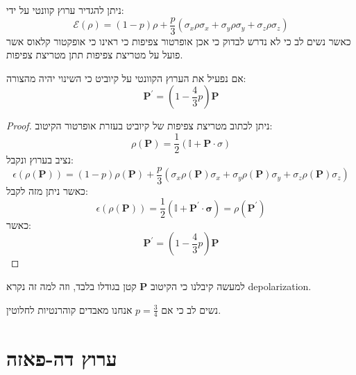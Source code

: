 \documentclass{tstextbook}
\begin{document}
\begin{corollary}
ניתן להגדיר ערוץ קוונטי על ידי:
$$\mathcal{E} \left(\rho\right)=\left(1-p\right)\rho+\frac{p}{3}\left(\sigma_{x}\rho\sigma_{x}+\sigma_{y}\rho\sigma_{y}+\sigma_{z}\rho\sigma_{z}\right)$$
כאשר נשים לב כי לא נדרש לבדוק כי אכן אופרטור צפיפות כי ראינו כי אופקטור קלאוס אשר פועל על מטריצת צפיפות תתן מטריצת צפיפות.

\end{corollary}
\begin{proposition}
אם נפעיל את הערוץ הקוונטי על קיוביט כי השינוי יהיה מהצורה:
$$\mathbf{P}^{\prime}=\left(1-{\frac{4}{3}}p\right)\mathbf{P}$$

\end{proposition}
\begin{proof}
ניתן לכתוב מטריצת צפיפות של קיוביט בעזרת אופרטור הקיטוב:
$$\rho\left(\mathbf{P}\right)={\frac{1}{2}}\left(\mathbb{I}+\mathbf{P}\cdot\sigma\right)$$
נציב בערוץ ונקבל:
$$\epsilon\left(\rho\left(\mathbf{P}\right)\right)=\left(1-p\right)\rho\left(\mathbf{P}\right)+{\frac{p}{3}}\left(\sigma_{x}\rho\left(\mathbf{P}\right)\sigma_{x}+\sigma_{y}\rho\left(\mathbf{P}\right)\sigma_{y}+\sigma_{z}\rho\left(\mathbf{P}\right)\sigma_{z}\right)$$
כאשר ניתן מזה לקבל:
$$\epsilon\left(\rho\left(\mathbf{P}\right)\right)={\frac{1}{2}}\left(\mathbb{I}+\mathbf{P^{\prime}}\cdot\boldsymbol\sigma\right)=\rho\left(\mathbf{P^{\prime}}\right)$$
כאשר:
$$\mathbf{P}^{\prime}=\left(1-{\frac{4}{3}}p\right)\mathbf{P}$$

\end{proof}
\begin{remark}
למעשה קיבלנו כי הקיטוב \(\mathbf{P}\) קטן בגודלו בלבד, וזה למה זה נקרא depolarization.

\end{remark}
\begin{remark}
נשים לב כי אם \(p=\frac{3}{4}\) אנחנו מאבדים קוהרנטיות לחלוטין.

\end{remark}
\section{ערוץ דה-פאזה}
\end{document}

